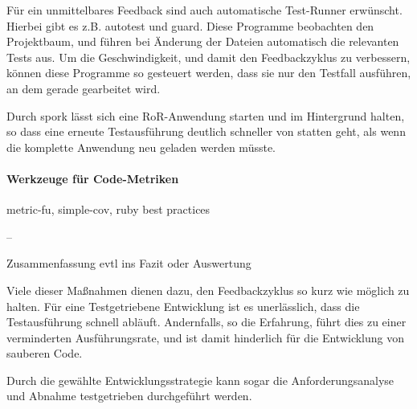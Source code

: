 Für ein unmittelbares Feedback sind auch automatische Test-Runner erwünscht. Hierbei gibt es z.B. autotest und guard. Diese Programme beobachten den Projektbaum, und führen bei Änderung der Dateien automatisch die relevanten Tests aus. Um die Geschwindigkeit, und damit den Feedbackzyklus zu verbessern, können diese Programme so gesteuert werden, dass sie nur den Testfall ausführen, an dem gerade gearbeitet wird. 

Durch spork lässt sich eine RoR-Anwendung starten und im Hintergrund halten, so dass eine erneute Testausführung deutlich schneller von statten geht, als wenn die komplette Anwendung neu geladen werden müsste.

    
\paragraph{Werkzeuge für Code-Metriken}  metric-fu, simple-cov, ruby best practices

--

Zusammenfassung evtl ins Fazit oder Auswertung

Viele dieser Maßnahmen dienen dazu, den Feedbackzyklus so kurz wie möglich zu halten. Für eine Testgetriebene Entwicklung ist es unerlässlich, dass die Testausführung schnell abläuft. Andernfalls, so die Erfahrung, führt dies zu einer verminderten Ausführungsrate, und ist damit hinderlich für die Entwicklung von sauberen Code.

Durch die gewählte Entwicklungsstrategie kann sogar die Anforderungsanalyse und Abnahme testgetrieben durchgeführt werden. 
